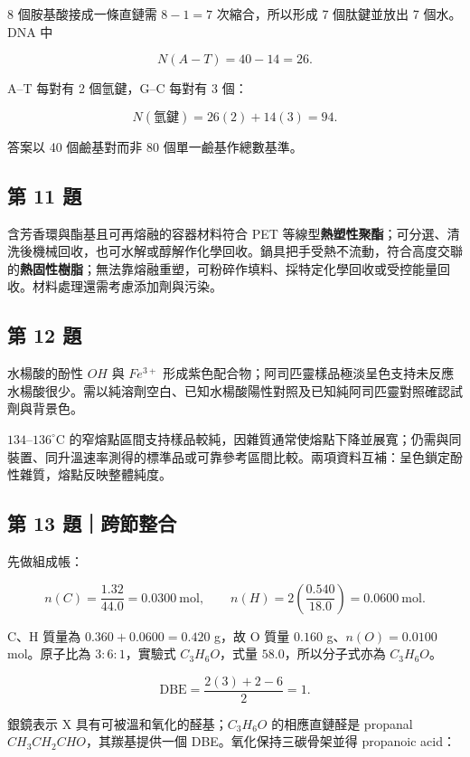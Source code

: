 \documentclass[11pt,a4paper]{article}
\begin{document}
8 個胺基酸接成一條直鏈需 \(8-1=7\) 次縮合，所以形成 7 個肽鍵並放出 7 個水。DNA 中

\[
N(A\!-\!T)=40-14=26.
\]

A--T 每對有 2 個氫鍵，G--C 每對有 3 個：

\[
N(\text{氫鍵})=26(2)+14(3)=94.
\]

答案以 40 個鹼基對而非 80 個單一鹼基作總數基準。

\subsection{第 11 題}\label{ux7b2c-11-ux984c}

含芳香環與酯基且可再熔融的容器材料符合 PET 等線型\textbf{熱塑性聚酯}；可分選、清洗後機械回收，也可水解或醇解作化學回收。鍋具把手受熱不流動，符合高度交聯的\textbf{熱固性樹脂}；無法靠熔融重塑，可粉碎作填料、採特定化學回收或受控能量回收。材料處理還需考慮添加劑與污染。

\subsection{第 12 題}\label{ux7b2c-12-ux984c}

水楊酸的酚性 \(OH\) 與 \(Fe^{3+}\) 形成紫色配合物；阿司匹靈樣品極淡呈色支持未反應水楊酸很少。需以純溶劑空白、已知水楊酸陽性對照及已知純阿司匹靈對照確認試劑與背景色。

\(134\)--\(136^\circ\mathrm C\) 的窄熔點區間支持樣品較純，因雜質通常使熔點下降並展寬；仍需與同裝置、同升溫速率測得的標準品或可靠參考區間比較。兩項資料互補：呈色鎖定酚性雜質，熔點反映整體純度。

\subsection{第 13 題｜跨節整合}\label{ux7b2c-13-ux984cux8de8ux7bc0ux6574ux5408}

先做組成帳：

\[
n(C)=\frac{1.32}{44.0}=0.0300\ \mathrm{mol},\qquad
n(H)=2\left(\frac{0.540}{18.0}\right)=0.0600\ \mathrm{mol}.
\]

C、H 質量為 \(0.360+0.0600=0.420\) g，故 O 質量 \(0.160\) g、\(n(O)=0.0100\) mol。原子比為 \(3:6:1\)，實驗式 \(C_3H_6O\)，式量 \(58.0\)，所以分子式亦為 \(C_3H_6O\)。

\[
\mathrm{DBE}=\frac{2(3)+2-6}{2}=1.
\]

銀鏡表示 X 具有可被溫和氧化的醛基；\(C_3H_6O\) 的相應直鏈醛是 propanal \(CH_3CH_2CHO\)，其羰基提供一個 DBE。氧化保持三碳骨架並得 propanoic acid：
\end{document}
